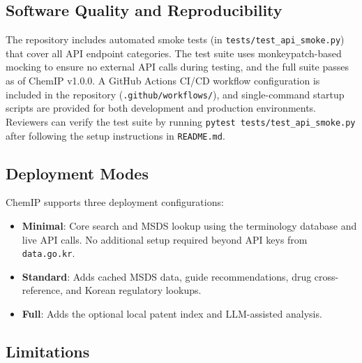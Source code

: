 \documentclass[preprint,12pt]{elsarticle}
\begin{document}
\subsection{Software Quality and Reproducibility}

The repository includes automated smoke tests (in \texttt{tests/test\_api\_smoke.py}) that cover all API endpoint categories. The test suite uses monkeypatch-based mocking to ensure no external API calls during testing, and the full suite passes as of ChemIP v1.0.0. A GitHub Actions CI/CD workflow configuration is included in the repository (\texttt{.github/workflows/}), and single-command startup scripts are provided for both development and production environments. Reviewers can verify the test suite by running \texttt{pytest tests/test\_api\_smoke.py} after following the setup instructions in \texttt{README.md}.

\subsection{Deployment Modes}

ChemIP supports three deployment configurations:

\begin{itemize}
\item \textbf{Minimal}: Core search and MSDS lookup using the terminology database and live API calls. No additional setup required beyond API keys from \texttt{data.go.kr}.
\item \textbf{Standard}: Adds cached MSDS data, guide recommendations, drug cross-reference, and Korean regulatory lookups.
\item \textbf{Full}: Adds the optional local patent index and LLM-assisted analysis.
\end{itemize}

\subsection{Limitations}
\end{document}
